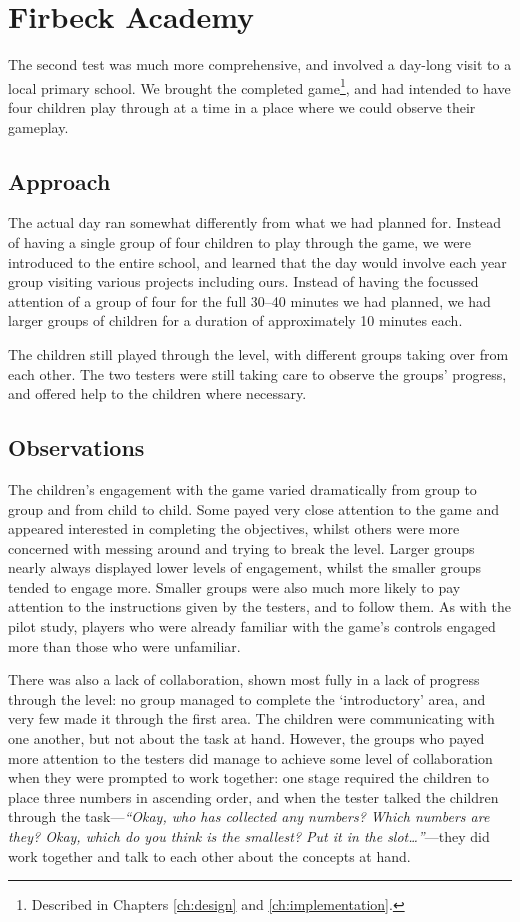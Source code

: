 \section{Firbeck Academy}
The second test was much more comprehensive, and involved a day-long visit to
a local primary school. We brought the completed game\footnote{Described in Chapters
\ref{ch:design} and \ref{ch:implementation}.}, and had intended to have four
children play through at a time in a place where we could observe their gameplay.

\subsection{Approach}
The actual day ran somewhat differently from what we had planned for. Instead of
having a single group of four children to play through the game, we were introduced
to the entire school, and learned that the day would involve each year group visiting
various projects including ours. Instead of having the focussed attention of a group
of four for the full 30--40 minutes we had planned, we had larger groups of children
for a duration of approximately 10 minutes each.

The children still played through the level, with different groups taking over from
each other. The two testers were still taking care to observe the groups' progress,
and offered help to the children where necessary.

\subsection{Observations}
The children's engagement with the game varied dramatically from group to group
and from child to child. Some payed very close attention to the game and appeared
interested in completing the objectives, whilst others were more concerned with
messing around and trying to break the level. Larger groups nearly always displayed
lower levels of engagement, whilst the smaller groups tended to engage more. Smaller
groups were also much more likely to pay attention to the instructions given
by the testers, and to follow them. As with the pilot study, players who were
already familiar with the game's controls engaged more than those who were unfamiliar.

There was also a lack of collaboration, shown most fully in a lack of progress through the level:
no group managed to complete the `introductory' area, and very few made it through
the first area. The children were communicating with one another, but not about the
task at hand. However, the groups who payed more attention
to the testers did manage to achieve some level of collaboration when they were
prompted to work together: one stage required the children to place three numbers
in ascending order, and when the tester talked the children through the task---\textit{``Okay,
who has collected any numbers? Which numbers are they? Okay, which do you
think is the smallest? Put it in the slot\ldots''}---they did work together and talk
to each other about the concepts at hand.

